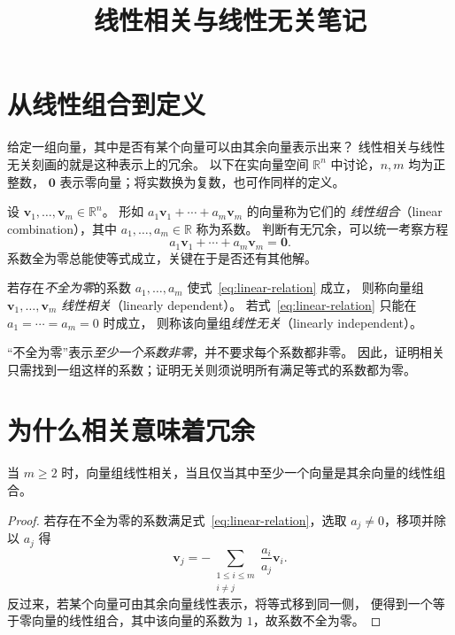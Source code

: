 \documentclass[UTF8,12pt,a4paper,fontset=fandol]{ctexart}
\title{线性相关与线性无关笔记}
\author{}
\date{}
\begin{document}
\maketitle

\section{从线性组合到定义}

给定一组向量，其中是否有某个向量可以由其余向量表示出来？
线性相关与线性无关刻画的就是这种表示上的冗余。
以下在实向量空间 $\mathbb R^n$ 中讨论，$n,m$ 均为正整数，
$\boldsymbol{0}$ 表示零向量；将实数换为复数，也可作同样的定义。

设 $\boldsymbol{v}_1,\ldots,\boldsymbol{v}_m\in\mathbb R^n$。
形如 $a_1\boldsymbol{v}_1+\cdots+a_m\boldsymbol{v}_m$ 的向量称为它们的
\emph{线性组合}（linear combination），其中 $a_1,\ldots,a_m\in\mathbb R$ 称为系数。
判断有无冗余，可以统一考察方程
\begin{equation}
  a_1\boldsymbol{v}_1+\cdots+a_m\boldsymbol{v}_m=\boldsymbol{0}.
  \label{eq:linear-relation}
\end{equation}
系数全为零总能使等式成立，关键在于是否还有其他解。

\begin{definition}[线性相关与线性无关]
若存在\emph{不全为零}的系数 $a_1,\ldots,a_m$ 使式~\eqref{eq:linear-relation} 成立，
则称向量组 $\boldsymbol{v}_1,\ldots,\boldsymbol{v}_m$ \emph{线性相关}（linearly dependent）。
若式~\eqref{eq:linear-relation} 只能在 $a_1=\cdots=a_m=0$ 时成立，
则称该向量组\emph{线性无关}（linearly independent）。
\end{definition}

“不全为零”表示\emph{至少一个系数非零}，并不要求每个系数都非零。
因此，证明相关只需找到一组这样的系数；证明无关则须说明所有满足等式的系数都为零。

\section{为什么相关意味着冗余}

\begin{proposition}
当 $m\geq2$ 时，向量组线性相关，当且仅当其中至少一个向量是其余向量的线性组合。
\end{proposition}

\begin{proof}
若存在不全为零的系数满足式~\eqref{eq:linear-relation}，选取 $a_j\neq0$，移项并除以 $a_j$ 得
\[
  \boldsymbol{v}_j=-\sum_{\substack{1\leq i\leq m\\i\neq j}}
  \frac{a_i}{a_j}\boldsymbol{v}_i.
\]
反过来，若某个向量可由其余向量线性表示，将等式移到同一侧，
便得到一个等于零向量的线性组合，其中该向量的系数为 $1$，故系数不全为零。
\end{proof}
\end{document}
